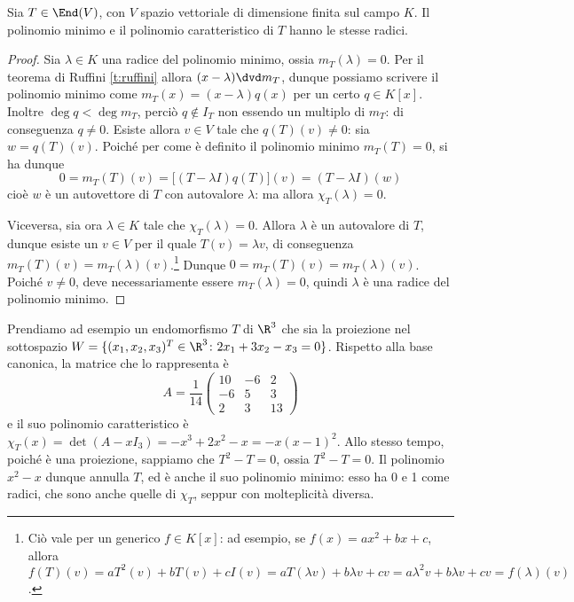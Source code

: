 \begin{teorema} \label{t:radici-polinomio-minimo-caratteristico}
	Sia $T\in \End(V)$, con $V$ spazio vettoriale di dimensione finita sul campo $K$.
	Il polinomio minimo e il polinomio caratteristico di $T$ hanno le stesse radici.
\end{teorema}
\begin{proof}
	Sia $\lambda\in K$ una radice del polinomio minimo, ossia $m_T(\lambda)=0$.
	Per il teorema di Ruffini \ref{t:ruffini} allora $(x-\lambda)\dvd m_T$, dunque possiamo scrivere il polinomio minimo come $m_T(x)=(x-\lambda)q(x)$ per un certo $q\in K[x]$.
	Inoltre $\deg q<\deg m_T$, perciò $q\notin I_T$ non essendo un multiplo di $m_T$: di conseguenza $q\ne 0$.
	Esiste allora $v\in V$ tale che $q(T)(v)\ne 0$: sia $w=q(T)(v)$.
	Poich\'e per come è definito il polinomio minimo $m_T(T)=0$, si ha dunque
	\begin{equation*}
		0=m_T(T)(v)=\big[(T-\lambda I)q(T)\big](v)=(T-\lambda I)(w)
	\end{equation*}
	cioè $w$ è un autovettore di $T$ con autovalore $\lambda$: ma allora $\chi_T(\lambda)=0$.

	Viceversa, sia ora $\lambda\in K$ tale che $\chi_T(\lambda) = 0$.
	Allora $\lambda$ è un autovalore di $T$, dunque esiste un $v\in V$ per il quale	$T(v)=\lambda v$, di conseguenza $m_T(T)(v)=m_T(\lambda)(v)$.\footnote{Ciò vale per un generico $f\in K[x]$: ad esempio, se $f(x)=ax^2+bx+c$, allora $f(T)(v)=aT^2(v)+bT(v)+cI(v)=aT(\lambda v)+b\lambda v+cv=a\lambda^2 v+b\lambda v+cv=f(\lambda)(v)$.}
	Dunque $0=m_T(T)(v)=m_T(\lambda)(v)$.
	Poich\'e $v\ne 0$, deve necessariamente essere $m_T(\lambda)=0$, quindi $\lambda$ è una radice del polinomio minimo.
\end{proof}
Prendiamo ad esempio un endomorfismo $T$ di $\R^3$ che sia la proiezione nel sottospazio $W=\{(x_1,x_2,x_3)^T\in\R^3\colon 2x_1+3x_2-x_3=0\}$.
Rispetto alla base canonica, la matrice che lo rappresenta è
\begin{equation*}
	A=\frac1{14}
	\begin{pmatrix}
		10	&-6	&2\\
		-6	&5	&3\\
		2	&3	&13
	\end{pmatrix}
\end{equation*}
e il suo polinomio caratteristico è $\chi_T(x)=\det(A-xI_3)=-x^3+2x^2-x=-x(x-1)^2$.
Allo stesso tempo, poich\'e è una proiezione, sappiamo che $T^2-T=0$, ossia $T^2-T=0$.
Il polinomio $x^2-x$ dunque annulla $T$, ed è anche il suo polinomio minimo: esso ha 0 e 1 come radici, che sono anche quelle di $\chi_T$, seppur con molteplicità diversa.

